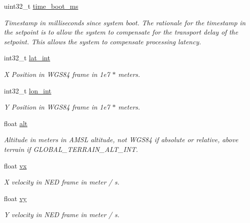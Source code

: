 \begin{DoxyCompactItemize}
\item 
uint32\+\_\+t \hyperlink{struct____mavlink__position__target__global__int__t_a4185bd4eabe762366b18c8988eaf1ec2}{time\+\_\+boot\+\_\+ms}
\begin{DoxyCompactList}\small\item\em Timestamp in milliseconds since system boot. The rationale for the timestamp in the setpoint is to allow the system to compensate for the transport delay of the setpoint. This allows the system to compensate processing latency. \end{DoxyCompactList}\item 
int32\+\_\+t \hyperlink{struct____mavlink__position__target__global__int__t_a21ecb220dfcd3793b5ff3a65a6b8e399}{lat\+\_\+int}
\begin{DoxyCompactList}\small\item\em X Position in W\+G\+S84 frame in 1e7 $\ast$ meters. \end{DoxyCompactList}\item 
int32\+\_\+t \hyperlink{struct____mavlink__position__target__global__int__t_ac2406961cedc91eb4b8a8a5745e86ec3}{lon\+\_\+int}
\begin{DoxyCompactList}\small\item\em Y Position in W\+G\+S84 frame in 1e7 $\ast$ meters. \end{DoxyCompactList}\item 
float \hyperlink{struct____mavlink__position__target__global__int__t_a26b9bcbff421d309dd3a9a9fc3d717ae}{alt}
\begin{DoxyCompactList}\small\item\em Altitude in meters in A\+M\+S\+L altitude, not W\+G\+S84 if absolute or relative, above terrain if G\+L\+O\+B\+A\+L\+\_\+\+T\+E\+R\+R\+A\+I\+N\+\_\+\+A\+L\+T\+\_\+\+I\+N\+T. \end{DoxyCompactList}\item 
float \hyperlink{struct____mavlink__position__target__global__int__t_ac54d0b4129df25ca60652b75fb3b423e}{vx}
\begin{DoxyCompactList}\small\item\em X velocity in N\+E\+D frame in meter / s. \end{DoxyCompactList}\item 
float \hyperlink{struct____mavlink__position__target__global__int__t_ab022fe86881cec55fa03dbb73dbc62eb}{vy}
\begin{DoxyCompactList}\small\item\em Y velocity in N\+E\+D frame in meter / s. \end{DoxyCompactList}\item 

\end{DoxyCompactItemize}
